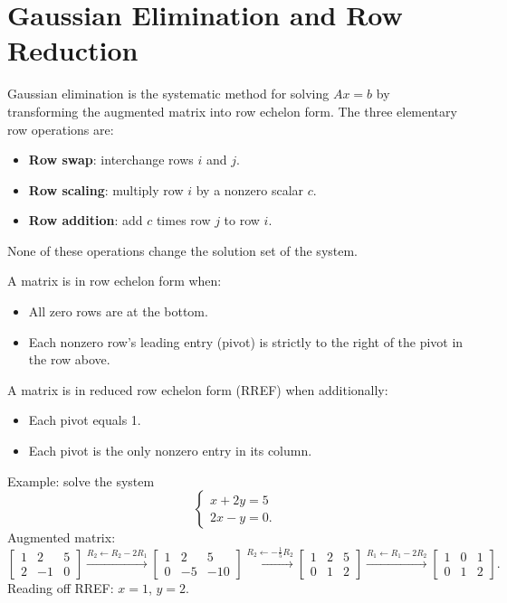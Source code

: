 \documentclass[11pt]{article}
\begin{document}
\section*{Gaussian Elimination and Row Reduction}

Gaussian elimination is the systematic method for solving $Ax = b$ by transforming the augmented matrix into row echelon form. The three elementary row operations are:
\begin{itemize}
  \item \textbf{Row swap}: interchange rows $i$ and $j$.
  \item \textbf{Row scaling}: multiply row $i$ by a nonzero scalar $c$.
  \item \textbf{Row addition}: add $c$ times row $j$ to row $i$.
\end{itemize}
None of these operations change the solution set of the system.

A matrix is in row echelon form when:
\begin{itemize}
  \item All zero rows are at the bottom.
  \item Each nonzero row's leading entry (pivot) is strictly to the right of the pivot in the row above.
\end{itemize}

A matrix is in reduced row echelon form (RREF) when additionally:
\begin{itemize}
  \item Each pivot equals 1.
  \item Each pivot is the only nonzero entry in its column.
\end{itemize}

Example: solve the system
\[
\begin{cases} x + 2y = 5 \\ 2x - y = 0. \end{cases}
\]
Augmented matrix:
\[
\begin{bmatrix} 1 & 2 & 5 \\ 2 & -1 & 0 \end{bmatrix}
\xrightarrow{R_2 \leftarrow R_2 - 2R_1}
\begin{bmatrix} 1 & 2 & 5 \\ 0 & -5 & -10 \end{bmatrix}
\xrightarrow{R_2 \leftarrow -\frac{1}{5}R_2}
\begin{bmatrix} 1 & 2 & 5 \\ 0 & 1 & 2 \end{bmatrix}
\xrightarrow{R_1 \leftarrow R_1 - 2R_2}
\begin{bmatrix} 1 & 0 & 1 \\ 0 & 1 & 2 \end{bmatrix}.
\]
Reading off RREF: $x = 1$, $y = 2$.
\end{document}
